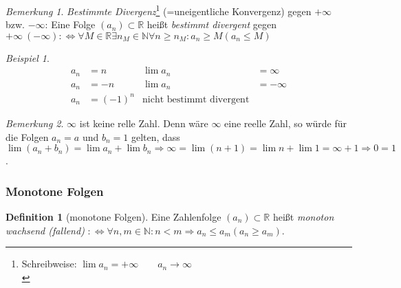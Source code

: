 \documentclass[ngerman,titlepage,twoside, parskip=half*]{scrreprt}
\newcommand*{\N}{\mathbb{N}}
\newcommand*{\R}{\mathbb{R}}
\newcommand*{\perdef}{:\Leftrightarrow}
\theoremstyle{plain}
\theoremstyle{definition}
\newtheorem{definition}{Definition}
\theoremstyle{remark}
\newtheorem*{remark}{Bemerkung}
\newtheorem*{beispiel}{Beispiel}
\begin{document}
\begin{remark}
  \emph{Bestimmte
    Divergenz}\footnote{Schreibweise: $\lim
    a_n = +\infty \qquad a_n \rightarrow \infty$\\} (=uneigentliche
  Konvergenz) gegen $+\infty$ bzw.
  $-\infty$: Eine Folge $(a_n) \subset \R$ heißt \emph{bestimmt
    divergent} gegen $+\infty\ (-\infty) \perdef \forall M
  \in \R  \exists n_M \in \N  \forall n \geq n_M \colon a_n \geq M (a_n
  \leq M)$
\end{remark}

\begin{beispiel}
\begin{align*}
  a_n& =n & \lim a_n &=\infty\\
  a_n &=-n  & \lim a_n &=-\infty\\
  a_n &=(-1)^n & \text{nicht bestimmt divergent}
\end{align*}
\end{beispiel}

\begin{remark}
  $\infty$ ist keine relle Zahl. Denn wäre $\infty$ eine reelle Zahl,
  so würde für die Folgen $a_n=a$ und $b_n=1$ gelten, dass $\lim
  (a_n+b_n) = \lim a_n + \lim b_n\Rightarrow\infty=\lim(n+1)=\lim n +
  \lim 1 = \infty +1 \Rightarrow 0=1$ \lightning.
\end{remark}

\subsubsection{Monotone Folgen}
\begin{definition}[monotone Folgen] Eine Zahlenfolge $(a_n) \subset \R$
  heißt \emph{monoton wachsend (fallend)}
   $\perdef \forall n,m \in \N\colon n<m \Rightarrow a_n
  \leq a_m (a_n \geq a_m)$.
\end{definition}
\end{document}
